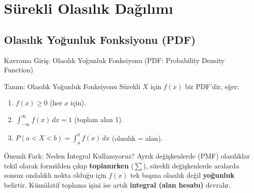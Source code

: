 ﻿\documentclass[light]{lutbeamer}
\begin{document}
\section{Sürekli Olasılık Dağılımı}
\subsection{Olasılık Yoğunluk Fonksiyonu (PDF)}

\begin{frame}{Kavrama Giriş: Olasılık Yoğunluk Fonksiyonu (PDF: Probability Density Function)}
\begin{block}{Tanım: Olasılık Yoğunluk Fonksiyonu}
  Sürekli $X$ için $f(x)$ bir PDF'dir, eğer:
  \begin{enumerate}
    \item $f(x) \ge 0$ \quad (her $x$ için).
    \item $\displaystyle\int_{-\infty}^{\infty} f(x)\,dx = 1$ \quad (toplam alan 1).
    \item $\displaystyle P(a < X < b) = \int_{a}^{b} f(x)\,dx$ \quad (olasılık = alan).
  \end{enumerate}
\end{block}

\begin{alertblock}{Önemli Fark: Neden İntegral Kullanıyoruz?}
  Ayrık değişkenlerde (PMF) olasılıklar tekil olarak formülden çıkıp \textbf{toplanırken} ($\sum$), sürekli değişkenlerde aralarda sonsuz ondalıklı nokta olduğu için $f(x)$ tek başına olasılık değil \textbf{yoğunluk} belirtir. Kümülatif toplama işini ise artık \textbf{integral (alan hesabı)} devralır.
\end{alertblock}
\end{frame}
\end{document}
